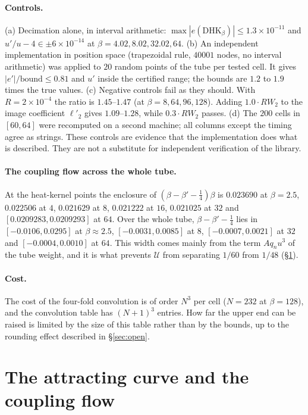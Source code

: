 \documentclass[11pt,a4paper]{article}
\theoremstyle{definition}
\theoremstyle{remark}
\newcommand{\HK}{\mathrm{HK}}
\newcommand{\cU}{\mathcal{U}}
\begin{document}
\paragraph{Controls.}
(a) Decimation alone, in interval arithmetic: $\max|e(\mathrm{D}\HK_\beta)|\le1.3\times10^{-11}$ and $u'/u-4\in\pm6\times10^{-14}$ at $\beta=4.02,8.02,32.02,64$.
(b) An independent implementation in position space (trapezoidal rule, $40001$ nodes, no interval arithmetic) was applied to $20$ random points of the tube per tested cell.
It gives $|e'|/\mathrm{bound}\le0.81$ and $u'$ inside the certified range; the bounds are $1.2$ to $1.9$ times the true values.
(c) Negative controls fail as they should.
With $R=2\times10^{-4}$ the ratio is $1.45$--$1.47$ (at $\beta=8,64,96,128$).
Adding $1.0\cdot RW_2$ to the image coefficient $\ell'_2$ gives $1.09$--$1.28$, while $0.3\cdot RW_2$ passes.
(d) The $200$ cells in $[60,64]$ were recomputed on a second machine; all columns except the timing agree as strings.
These controls are evidence that the implementation does what is described.
They are not a substitute for independent verification of the library.

\paragraph{The coupling flow across the whole tube.}
At the heat-kernel points the enclosure of $(\beta-\beta'-\tfrac14)\beta$ is $0.023690$ at $\beta=2.5$, $0.022506$ at $4$, $0.021629$ at $8$, $0.021222$ at $16$, $0.021025$ at $32$ and $[0.0209283,0.0209293]$ at $64$.
Over the whole tube, $\beta-\beta'-\tfrac14$ lies in $[-0.0106,0.0295]$ at $\beta\approx2.5$, $[-0.0031,0.0085]$ at $8$, $[-0.0007,0.0021]$ at $32$ and $[-0.0004,0.0010]$ at $64$.
This width comes mainly from the term $Aq_nu^3$ of the tube weight, and it is what prevents $\cU$ from separating $1/60$ from $1/48$ (\S\ref{sec:curve}).

\paragraph{Cost.}
The cost of the four-fold convolution is of order $N^3$ per cell ($N=232$ at $\beta=128$), and the convolution table has $(N+1)^3$ entries.
How far the upper end can be raised is limited by the size of this table rather than by the bounds, up to the rounding effect described in \S\ref{sec:open}.

\section{The attracting curve and the coupling flow}\label{sec:curve}
\end{document}
